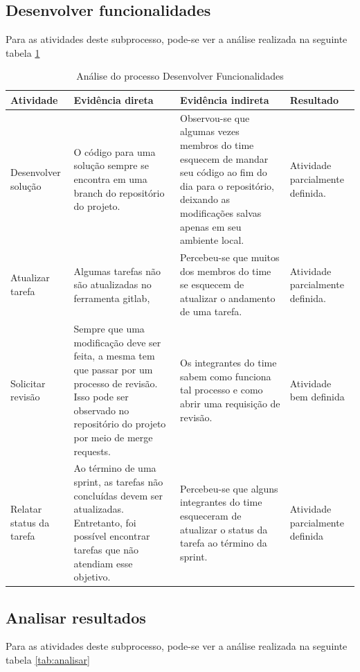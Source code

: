 \documentclass[a4paper, 11pt]{article}
\begin{document}
\subsection*{Desenvolver funcionalidades}

Para as atividades deste subprocesso, pode-se ver a análise realizada na
seguinte tabela \ref{tab:desenvolvimento}

\begin{table}[]
\centering
\caption{Análise do processo Desenvolver Funcionalidades}
\label{tab:desenvolvimento}
\begin{tabularx}{\textwidth}{|X|X|X|X|}
\hline
Atividade & Evidência direta & Evidência indireta & Resultado \\ \hline
Desenvolver solução & O código para uma solução sempre se encontra em uma branch do repositório do projeto. & Observou-se que algumas vezes membros do time esquecem de mandar seu código ao fim do dia para o repositório, deixando as modificações salvas apenas em seu ambiente local. & Atividade parcialmente definida. \\ \hline
Atualizar tarefa & Algumas tarefas não são atualizadas no ferramenta gitlab, & Percebeu-se que muitos dos membros do time se esquecem de atualizar o andamento de uma tarefa. & Atividade parcialmente definida. \\ \hline
Solicitar revisão & Sempre que uma modificação deve ser feita, a mesma tem que passar por um processo de revisão. Isso pode ser observado no repositório do projeto por meio de merge requests. & Os integrantes do time sabem como funciona tal processo e como abrir uma requisição de revisão. & Atividade bem definida \\ \hline
Relatar status da tarefa & Ao término de uma sprint, as tarefas não concluídas devem ser atualizadas. Entretanto, foi possível encontrar tarefas que não atendiam esse objetivo. & Percebeu-se que alguns integrantes do time esqueceram de atualizar o status da tarefa ao término da sprint. & Atividade parcialmente definida \\ \hline
\end{tabularx}
\end{table}


\subsection*{Analisar resultados}

Para as atividades deste subprocesso, pode-se ver a análise realizada na
seguinte tabela \ref{tab:analisar}
\end{document}
